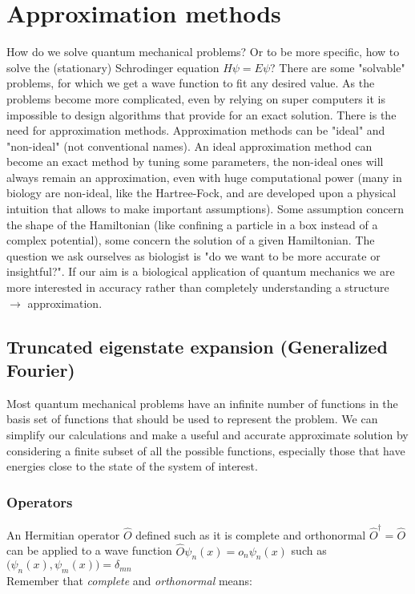 \graphicspath{{chapters/05/}}
\chapter{Approximation methods}
How do we solve quantum mechanical problems? Or to be more specific, how to solve the (stationary) Schrodinger equation $ H \psi = E \psi$? There are some "solvable" problems, for which we get a wave function to fit any desired value.
As the problems become more complicated, even by relying on super computers it is impossible to design algorithms that provide for an exact solution.
There is the need for approximation methods.
Approximation methods can be "ideal" and "non-ideal" (not conventional names).
An ideal approximation method can become an exact method by tuning some parameters, the non-ideal ones will always remain an approximation, even with huge computational power (many in biology are non-ideal, like the Hartree-Fock, and are developed upon a physical intuition that allows to make important assumptions).
Some assumption concern the shape of the Hamiltonian (like confining a particle in a box instead of a complex potential), some concern the solution of a given Hamiltonian.
The question we ask ourselves as biologist is "do we want to be more accurate or insightful?".
If our aim is a biological application of quantum mechanics we are more interested in accuracy rather than completely understanding a structure $\rightarrow$ approximation.

\section{Truncated eigenstate expansion (Generalized Fourier)}
Most quantum mechanical problems have an infinite number of functions in the basis set of functions that should be used to represent the problem.
We can simplify our calculations and make a useful and accurate approximate solution by considering a finite subset of all the possible functions, especially those that have energies close to the state of the system of interest.

	\subsection{Operators}
	An Hermitian operator $\hat{O}$ defined such as it is complete and orthonormal $\hat{O}^\dagger=\hat{O}$ can be applied to a wave function $\hat{O}\psi_n(x)=o_n\psi_n(x)$ such as $\bigl(\psi_n(x),\psi_m(x)\bigr)=\delta_{mn}$\\
	Remember that \textit{complete} and \textit{orthonormal} means:


